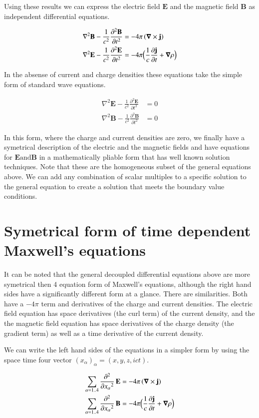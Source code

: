 \documentclass{article}      %
\newcommand{\grad}[0]{\boldsymbol{\nabla}}
\newcommand{\curl}[0]{\grad \times}
\newcommand{\delsquared}[0]{\nabla^2}
\newcommand{\delambert}[1]{\sum_{\alpha = 1 .. 4}{\Dsq{x_\alpha}{#1}}}
\newcommand{\D}[2] {\frac {\partial #2} {\partial #1}}
\newcommand{\Dsq}[2] {\frac {\partial^2 #2} {\partial {#1}^2}}
\newcommand{\Bj}[0]{\mathbf{j}}
\newcommand{\BB}[0]{\mathbf{B}}
\newcommand{\BE}[0]{\mathbf{E}}
\begin{document}
Using these results we can express the 
electric field $\BE$ and the
magnetic field $\BB$
as independent differential equations.

\begin{align*}
\delsquared \BB - \frac{1}{c^2} \Dsq{t}{\BB} &= - 4\pi \left(\curl \Bj\right) \\
\delsquared \BE - \frac{1}{c^2} \Dsq{t}{\BE} &= - 4\pi \Bigl(\frac{1}{c} \D{t}{\Bj} + \grad{\rho}\Bigr)
\end{align*}

In the absense of current and charge densities these equations take the simple form of standard wave
equations.

\begin{align*}
\delsquared \BE - \frac{1}{c^2} \Dsq{t}{\BE} &= 0 \\
\delsquared \BB - \frac{1}{c^2} \Dsq{t}{\BB} &= 0
\end{align*}

In this form, where the charge and current densities are zero, we finally have 
a symetrical description of the electric and the magnetic fields and have equations 
for $\BE \text{and} \BB$ in a mathematically pliable form that has well known 
solution techniques.
Note that these are the homogeneous subset of the general equations above.
We can add any combination of scalar multiples to a specific solution 
to the general equation to create a solution that meets the boundary 
value conditions.

\section{Symetrical form of time dependent Maxwell's equations}

It can 
be noted that the general decoupled differential equations above are more 
symetrical then 4 equation form of Maxwell's equations, although the
right hand sides have a significantly different form at a glance.  There
are similarities.  Both have a $-4\pi$ term and derivatives of the charge and
current densities.  The electric field equation has space derivatives (the curl term) of 
the current density, and the the magnetic field equation has space derivatives of 
the charge density (the gradient term) as well as a time derivative of the current
density.

We can write the left hand sides of the equations in a simpler form by using the 
space time four vector $(x_\alpha)_\alpha = (x, y, z, ict)$.

\begin{align*}
\delambert{} \,\BE &= - 4\pi \left(\curl \Bj\right) \\
\delambert{} \,\BB &= - 4\pi \Bigl(\frac{1}{c} \D{t}{\Bj} + \grad{\rho}\Bigr)
\end{align*}
\end{document}
